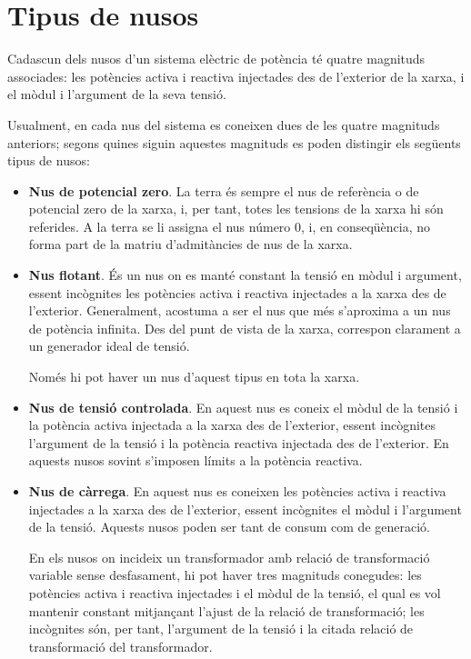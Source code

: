 \section{Tipus de nusos} 

Cadascun dels nusos d'un sistema elèctric de potència té quatre
magnituds associades: les potències activa i reactiva injectades des
de l'exterior de la xarxa, i el mòdul i l'argument de la seva
tensió.

Usualment, en cada nus del sistema es coneixen dues de les quatre
magnituds anteriors; segons quines siguin aquestes magnituds es
poden distingir els següents tipus de nusos:
\begin{itemize}
    \item \textbf{Nus de potencial zero}. La terra és sempre el nus de referència o de potencial zero de la
    xarxa, i, per tant, totes les tensions de la xarxa hi són referides.
    A la terra se li assigna el   nus número 0, i, en conseqüència, no forma part de la matriu d'admitàncies de nus de la xarxa.

   \item \textbf{Nus flotant}. És un nus on es manté constant la tensió en mòdul i argument,
   essent incògnites les potències activa i reactiva injectades a la xarxa des de l'exterior.
    Generalment, acostuma a ser el nus que més s'aproxima a un nus de potència infinita. Des del
    punt de vista de la xarxa, correspon clarament a un generador ideal de tensió.

Només hi pot haver un nus d'aquest tipus en tota la xarxa.
   \item \textbf{Nus de tensió controlada}. En aquest nus es coneix el mòdul de la tensió i la
   potència activa injectada a la xarxa des de l'exterior, essent incògnites l'argument de la tensió i la potència
   reactiva injectada des de l'exterior. En aquests nusos sovint s'imposen límits a la potència reactiva.

   \item \textbf{Nus de càrrega}. En aquest nus es coneixen les potències activa i reactiva
   injectades a la xarxa des de l'exterior, essent incògnites el mòdul i l'argument de la tensió.
   Aquests nusos poden ser tant de consum com de generació.

En els nusos on incideix un transformador amb relació de
transformació variable sense desfasament, hi pot haver tres magnituds
conegudes: les potències activa i reactiva injectades i el mòdul de
la tensió, el qual es vol mantenir constant mitjançant l'ajust de la
relació de transformació; les incògnites són, per tant, l'argument de
la tensió i la citada relació de transformació del transformador.
\end{itemize}

